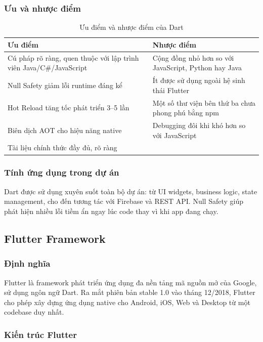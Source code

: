 \subsubsection{Ưu và nhược điểm}

\begin{table}[H]
\centering
\caption{Ưu điểm và nhược điểm của Dart}
\begin{tabularx}{\textwidth}{|X|X|}
\hline
\textbf{Ưu điểm} & \textbf{Nhược điểm} \\
\hline
Cú pháp rõ ràng, quen thuộc với lập trình viên Java/C\#/JavaScript & Cộng đồng nhỏ hơn so với JavaScript, Python hay Java \\
\hline
Null Safety giảm lỗi runtime đáng kể & Ít được sử dụng ngoài hệ sinh thái Flutter \\
\hline
Hot Reload tăng tốc phát triển 3--5 lần & Một số thư viện bên thứ ba chưa phong phú bằng npm \\
\hline
Biên dịch AOT cho hiệu năng native & Debugging đôi khi khó hơn so với JavaScript \\
\hline
Tài liệu chính thức đầy đủ, rõ ràng & \\
\hline
\end{tabularx}
\end{table}

\subsubsection{Tính ứng dụng trong dự án}

Dart được sử dụng xuyên suốt toàn bộ dự án: từ UI widgets, business logic, state management, cho đến tương tác với Firebase và REST API. Null Safety giúp phát hiện nhiều lỗi tiềm ẩn ngay lúc code thay vì khi app đang chạy.

\subsection{Flutter Framework}

\subsubsection{Định nghĩa}

Flutter là framework phát triển ứng dụng đa nền tảng mã nguồn mở của Google, sử dụng ngôn ngữ Dart. Ra mắt phiên bản stable 1.0 vào tháng 12/2018, Flutter cho phép xây dựng ứng dụng native cho Android, iOS, Web và Desktop từ một codebase duy nhất.

\subsubsection{Kiến trúc Flutter}

